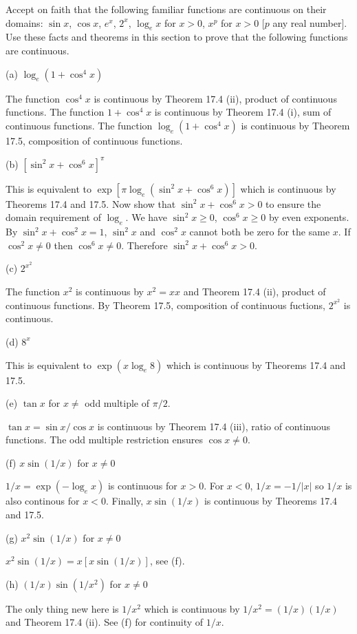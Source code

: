 
Accept on faith that the following familiar functions are continuous on
their domains: $\sin x$, $\cos x$, $e^x$, $2^x$, $\log_e x$ for
$x>0$, $x^p$ for $x>0$ [$p$ any real number].
Use these facts and theorems in this section to prove that the following
functions are continuous.

\medskip
\noindent
(a) $\log_e(1+\cos^4 x)$

\medskip
\itemitem{}
The function $\cos^4 x$ is continuous by Theorem 17.4 (ii),
product of continuous functions.
The function $1+\cos^4 x$ is continuous by Theorem 17.4 (i),
sum of continuous functions.
The function $\log_e(1+\cos^4 x)$ is continuous by Theorem 17.5,
composition of continuous functions.

\medskip
\noindent
(b) $[\sin^2x+\cos^6x]^\pi$

\medskip
\itemitem{}
This is equivalent to $\exp[\pi\log_e(\sin^2x+\cos^6x)]$ which is continuous by
Theorems 17.4 and 17.5.
Now show that $\sin^2x+\cos^6x>0$ to ensure the domain requirement of $\log_e$.
We have $\sin^2x\ge0$, $\cos^6x\ge0$ by even exponents.
By $\sin^2x+\cos^2x=1$, $\sin^2x$ and $\cos^2x$ cannot both be zero for the
same $x$.
If $\cos^2x\ne0$ then $\cos^6x\ne0$.
Therefore $\sin^2x+\cos^6x>0$.

\medskip
\noindent
(c) $2^{x^2}$

\medskip
\itemitem{}
The function $x^2$ is continuous by $x^2=xx$ and
Theorem 17.4 (ii), product of continuous functions.
By Theorem 17.5, composition of continuous fuctions, $2^{x^2}$ is continuous.

\medskip
\noindent
(d) $8^x$

\medskip
\itemitem{}
This is equivalent to $\exp(x\log_e8)$ which is continuous by Theorems 17.4 and 17.5.

\medskip
\noindent
(e) $\tan x$ for $x\ne$ odd multiple of $\pi/2$.

\medskip
\itemitem{}
$\tan x=\sin x/\cos x$ is continuous by Theorem 17.4 (iii), ratio of
continuous functions.
The odd multiple restriction ensures $\cos x\ne0$.

\medskip
\noindent
(f) $x\sin(1/x)$ for $x\ne0$

\medskip
\itemitem{}
$1/x=\exp(-\log_ex)$ is continuous for $x>0$.
For $x<0$, $1/x=-1/|x|$ so $1/x$ is also continous for $x<0$.
Finally, $x\sin(1/x)$ is continuous by Theorems 17.4 and 17.5.

\medskip
\noindent
(g) $x^2\sin(1/x)$ for $x\ne0$

\medskip
\itemitem{}
$x^2\sin(1/x)=x[x\sin(1/x)]$, see (f).

\medskip
\noindent
(h) $(1/x)\sin(1/x^2)$ for $x\ne0$

\medskip
\itemitem{}
The only thing new here is $1/x^2$ which is continuous by $1/x^2=(1/x)(1/x)$
and Theorem 17.4 (ii). See (f) for continuity of $1/x$.
